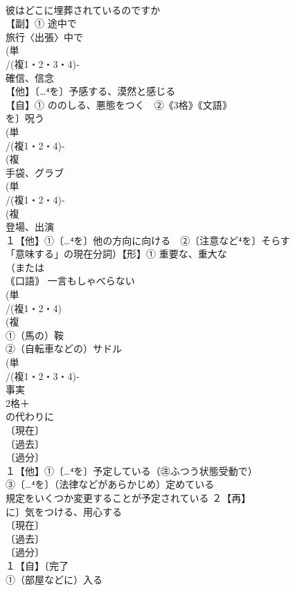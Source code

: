 \documentclass[8pt]{extreport}
\begin{document}
\begin{CJK}{UTF8}{min}
\\	彼はどこに埋葬されているのですか
\\	【副】① 途中で 
\\	旅行〈出張〉中で
\\	(単
\\	/(複1・2・3・4)‐
\\	確信、信念 
\\	【他】〔…⁴を〕予感する、漠然と感じる
\\	【自】① ののしる、悪態をつく　②《3格》｟文語｠
\\	を〕呪う
\\	(単
\\	/(複1・2・4)-
\\	(複
\\	手袋、グラブ 
\\	(単
\\	/(複1・2・4)-
\\	(複
\\	登場、出演 
\\	１【他】①〔…⁴を〕他の方向に向ける　②〔注意など⁴を〕そらす
\\	「意味する」の現在分詞）【形】① 重要な、重大な 
\\	（または
\\	｟口語｠ 一言もしゃべらない
\\	(単
\\	/(複1・2・4)
\\	(複
\\	①（馬の）鞍 
\\	②（自転車などの）サドル
\\	(単
\\	/(複1・2・3・4)‐
\\	事実 
\\	2格＋
\\	の代わりに
\\	〔現在〕
\\	〔過去〕
\\	〔過分〕
\\	１【他】①〔…⁴を〕予定している（㊟ふつう状態受動で）
\\	③〔…⁴を〕（法律などがあらかじめ）定めている 
\\	規定をいくつか変更することが予定されている ２【再】
\\	に〕気をつける、用心する
\\	〔現在〕
\\	〔過去〕
\\	〔過分〕
\\	１【自】〔完了
\\	①（部屋などに）入る 

\end{CJK}
\end{document}
